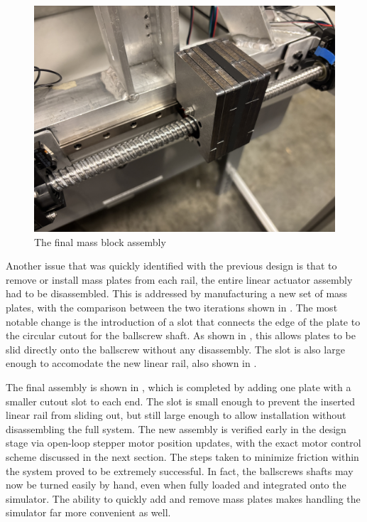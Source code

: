 \begin{figure}[p]
    \centering
    \includegraphics[width=0.85\linewidth]{figures/completed_block.jpg}
    \caption{The final mass block assembly}
    \label{fig:plate_comparison}
\end{figure}


Another issue that was quickly identified with the previous design is that to remove or install mass plates from each rail, the entire linear actuator assembly had to be disassembled. This is addressed by manufacturing a new set of mass plates, with the comparison between the two iterations shown in . The most notable change is the introduction of a slot that connects the edge of the plate to the circular cutout for the ballscrew shaft. As shown in , this allows plates to be slid directly onto the ballscrew without any disassembly. The slot is also large enough to accomodate the new linear rail, also shown in . 

The final assembly is shown in , which is completed by adding one plate with a smaller cutout slot to each end. The slot is small enough to prevent the inserted linear rail from sliding out, but still large enough to allow installation without disassembling the full system. The new assembly is verified early in the design stage via open-loop stepper motor position updates, with the exact motor control scheme discussed in the next section. The steps taken to minimize friction within the system proved to be extremely successful. In fact, the ballscrews shafts may now be turned easily by hand, even when fully loaded and integrated onto the simulator. The ability to quickly add and remove mass plates makes handling the simulator far more convenient as well.

